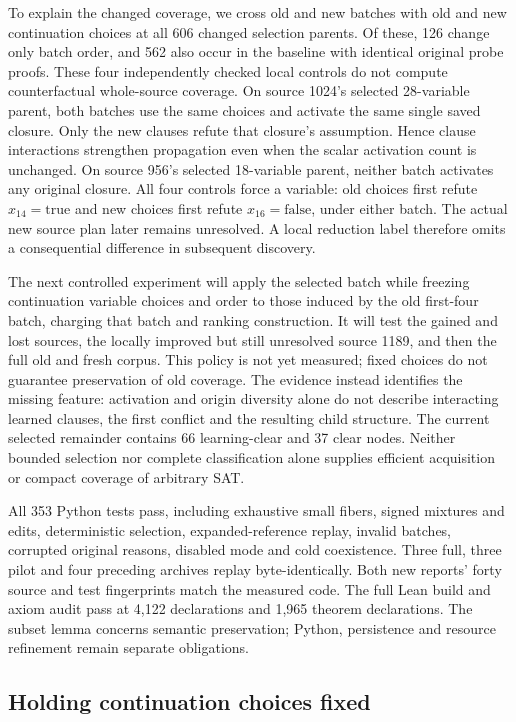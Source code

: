 \documentclass[11pt,a4paper]{article}
\numberwithin{equation}{section}
\theoremstyle{plain}
\theoremstyle{definition}
\theoremstyle{remark}
\begin{document}
To explain the changed coverage, we cross old and new batches with old and new continuation choices at all 606 changed selection parents. Of these, 126 change only batch order, and 562 also occur in the baseline with identical original probe proofs. These four independently checked local controls do not compute counterfactual whole-source coverage. On source 1024's selected 28-variable parent, both batches use the same choices and activate the same single saved closure. Only the new clauses refute that closure's assumption. Hence clause interactions strengthen propagation even when the scalar activation count is unchanged. On source 956's selected 18-variable parent, neither batch activates any original closure. All four controls force a variable: old choices first refute $x_{14}=\mathrm{true}$ and new choices first refute $x_{16}=\mathrm{false}$, under either batch. The actual new source plan later remains unresolved. A local reduction label therefore omits a consequential difference in subsequent discovery.

The next controlled experiment will apply the selected batch while freezing continuation variable choices and order to those induced by the old first-four batch, charging that batch and ranking construction. It will test the gained and lost sources, the locally improved but still unresolved source 1189, and then the full old and fresh corpus. This policy is not yet measured; fixed choices do not guarantee preservation of old coverage. The evidence instead identifies the missing feature: activation and origin diversity alone do not describe interacting learned clauses, the first conflict and the resulting child structure. The current selected remainder contains 66 learning-clear and 37 clear nodes. Neither bounded selection nor complete classification alone supplies efficient acquisition or compact coverage of arbitrary SAT.

All 353 Python tests pass, including exhaustive small fibers, signed mixtures and edits, deterministic selection, expanded-reference replay, invalid batches, corrupted original reasons, disabled mode and cold coexistence. Three full, three pilot and four preceding archives replay byte-identically. Both new reports' forty source and test fingerprints match the measured code. The full Lean build and axiom audit pass at 4,122 declarations and 1,965 theorem declarations. The subset lemma concerns semantic preservation; Python, persistence and resource refinement remain separate obligations.

\subsection{Holding continuation choices fixed}
\label{sec:learning-fixed-order}
\end{document}
